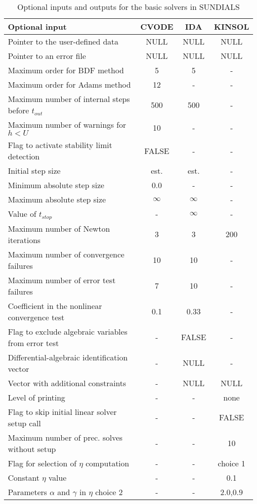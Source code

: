 \begin{table}[tp]
\label{t:optional_io}
\centering
\caption{Optional inputs and outputs for the basic solvers in SUNDIALS}
\medskip
\begin{tabular}{|p{2.75in}|c|c|c|}
\hline
{\bf Optional input} & CVODE  & IDA & KINSOL \\
\hline
Pointer to the user-defined data & NULL & NULL& NULL \\
Pointer to an error file & NULL & NULL & NULL \\
Maximum order for BDF method & 5 & 5 & - \\
Maximum order for Adams method& 12  & - & - \\
Maximum number of internal steps before $t_{out}$ & 500 & 500 & - \\
Maximum number of warnings for $h < U$ & 10 & - & - \\
Flag to activate stability limit detection & FALSE & - & - \\
Initial step size & est. & est. & - \\
Minimum absolute step size & 0.0 & - & - \\
Maximum absolute step size & $\infty$ & $\infty$ & - \\
Value of $t_{stop}$ & - & $\infty$ & - \\
Maximum number of Newton iterations & 3 & 3 & 200 \\
Maximum number of convergence failures & 10 & 10 & - \\
Maximum number of error test failures & 7 & 10 & - \\
Coefficient in the nonlinear convergence test & 0.1 & 0.33 & - \\
Flag to exclude algebraic variables from error test & - & FALSE & - \\
Differential-algebraic identification vector & - & NULL & - \\
Vector with additional constraints & - & NULL & NULL \\
Level of printing & - & - & none \\
Flag to skip initial linear solver setup call & - & - & FALSE \\
Maximum number of prec. solves without setup & - & - & 10 \\
Flag for selection of $\eta$ computation & - & - & choice 1 \\
Constant $\eta$ value & - & - & 0.1 \\
Parameters $\alpha$ and $\gamma$ in $\eta$ choice 2 & - & - & $2.0$,$0.9$\\

\end{tabular}
\end{table}
